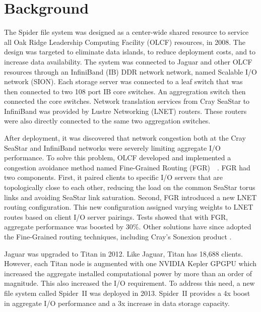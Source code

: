 \section{Background}

The Spider file system was designed as a center-wide shared resource to service
all Oak Ridge Leadership Computing Facility (OLCF) resources, in 2008. The
design was targeted to eliminate data islands, to reduce deployment costs, and
to increase data availability. The system was connected to Jaguar and other
OLCF resources through an InfiniBand (IB) DDR network network, named Scalable
I/O network (SION).  Each storage server was connected to a leaf switch that
was then connected to two 108 port IB core switches.  An aggregration switch
then connected the core switches.  Network translation services from Cray
SeaStar to InfiniBand was provided by Lustre Networking (LNET) routers. These
routers were also directly connected to the same two aggregation switches.    

After deployment, it was discovered that network congestion both at the Cray
SeaStar and InfiniBand networks were severely limiting aggregate I/O
performance. To solve this problem, OLCF developed and implemented a congestion
avoidance method named Fine-Grained Routing
(FGR)~\cite{dillow-fgr}~\cite{dillow-fgr2}. FGR had two components.  First, it
paired clients to specific I/O servers that are topologically close to each
other, reducing the load on the common SeaStar torus links and avoiding SeaStar
link saturation. Second, FGR introduced a new LNET routing configuration. This
new configuration assigned varying weights to LNET routes based on client I/O
server pairings. Tests showed that with FGR, aggregate performance was boosted
by 30\%.  Other solutions have since adopted the Fine-Grained routing
techniques, including Cray's Sonexion product \cite{cray-fgr}.
 
Jaguar was upgraded to Titan in 2012. Like Jaguar, Titan has 18,688 clients.
However, each Titan node is augmented with one NVIDIA Kepler GPGPU
which increased the aggregate installed computational power by more than an
order of magnitude.  This also increased the I/O requirement. To address this
need, a new file system called Spider~II was deployed in 2013. Spider~II
provides a 4x boost in aggregate I/O performance and a 3x increase in data
storage capacity.

